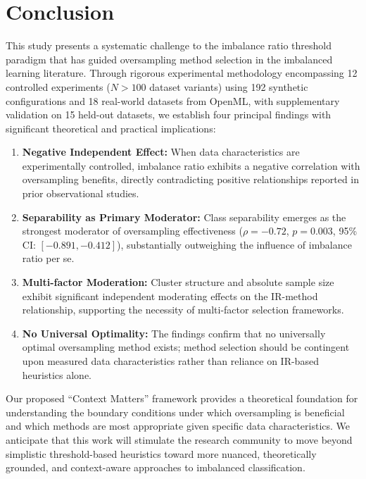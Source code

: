 \documentclass{ijSmartGrid}
\theoremstyle{definition}
\begin{document}
\section{Conclusion}
\indent This study presents a systematic challenge to the imbalance ratio threshold paradigm that has guided oversampling method selection in the imbalanced learning literature. Through rigorous experimental methodology encompassing 12 controlled experiments ($N>100$ dataset variants) using 192 synthetic configurations and 18 real-world datasets from OpenML, with supplementary validation on 15 held-out datasets, we establish four principal findings with significant theoretical and practical implications:

\begin{enumerate}
    \item \textbf{Negative Independent Effect:} When data characteristics are experimentally controlled, imbalance ratio exhibits a negative correlation with oversampling benefits, directly contradicting positive relationships reported in prior observational studies.
    
    \item \textbf{Separability as Primary Moderator:} Class separability emerges as the strongest moderator of oversampling effectiveness ($\rho=-0.72$, $p=0.003$, 95\% CI: $[-0.891, -0.412]$), substantially outweighing the influence of imbalance ratio per se.
    
    \item \textbf{Multi-factor Moderation:} Cluster structure and absolute sample size exhibit significant independent moderating effects on the IR-method relationship, supporting the necessity of multi-factor selection frameworks.
    
    \item \textbf{No Universal Optimality:} The findings confirm that no universally optimal oversampling method exists; method selection should be contingent upon measured data characteristics rather than reliance on IR-based heuristics alone.
\end{enumerate}

\indent Our proposed ``Context Matters'' framework provides a theoretical foundation for understanding the boundary conditions under which oversampling is beneficial and which methods are most appropriate given specific data characteristics. We anticipate that this work will stimulate the research community to move beyond simplistic threshold-based heuristics toward more nuanced, theoretically grounded, and context-aware approaches to imbalanced classification.
\end{document}
